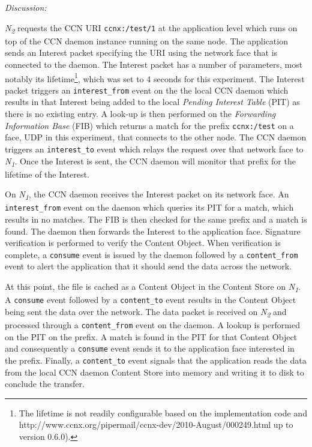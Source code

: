 \documentclass[a4paper,12pt]{report}      %
\begin{document}
\noindent\emph{Discussion:}

 \emph{N\textsubscript{2}} requests the CCN URI \verb!ccnx:/test/1! at the application level which runs on top
of the CCN daemon instance running on the same node. The application sends an Interest packet
specifying the URI using the network face that is connected to the daemon. The Interest packet has a
number of parameters, most notably its lifetime\footnote{The lifetime is not readily configurable based on the implementation code and http://www.ccnx.org/pipermail/ccnx-dev/2010-August/000249.html up to version 0.6.0).}, which was set to 4 seconds for this experiment. \cite{CCNxIM}
The Interest packet triggers an \verb!interest_from! event on the the local CCN daemon which results in that
Interest being added to the local \textsl{Pending Interest Table} (PIT) as there is no existing entry. A look-up is then performed on the \textsl{Forwarding Information Base} (FIB) which returns a match for the prefix
\verb!ccnx:/test! on a face, UDP in this experiment, that connects to the other node. The CCN daemon
triggers an \verb!interest_to! event which relays the request over that network face to  \emph{N\textsubscript{1}}. Once
the Interest is sent, the CCN daemon will monitor that prefix for the lifetime of the Interest.

On \emph{N\textsubscript{1}}, the CCN daemon receives the Interest packet on its network face.
An \verb!interest_from! event on the daemon which queries its PIT for a match, which results in no
matches. The FIB is then checked for the same prefix and a match is found. The daemon then forwards
the Interest to the application face. Signature verification is performed to verify the Content Object.
When verification is complete, a \verb!consume! event is issued by the daemon followed by a
\verb!content_from! event to alert the application that it should send the data across the network.

At this point, the file is cached as a Content Object in the Content Store on  \emph{N\textsubscript{1}}. A
\verb!consume! event followed by a \verb!content_to! event results in the Content Object being sent the data
over the network. The data packet is received on  \emph{N\textsubscript{2}} and processed through a
\verb!content_from! event on the daemon. A lookup is performed on the PIT on the prefix. A match is found
in the PIT for that Content Object and consequently a \verb!consume! event sends it to the application face
interested in the prefix. Finally, a \verb!content_to! event signals that the application reads the data from the local CCN daemon Content Store into memory and writing it to disk to conclude the transfer.
\end{document}
